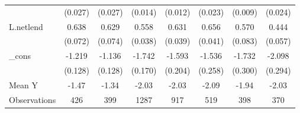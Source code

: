 {\begin{tabular}{l*{7}{c}}
            &     (0.027)         &     (0.027)         &     (0.014)         &     (0.012)         &     (0.023)         &     (0.009)         &     (0.024)         \\
\addlinespace
L.netlend   &       0.638\sym{***}&       0.629\sym{***}&       0.558\sym{***}&       0.631\sym{***}&       0.656\sym{***}&       0.570\sym{***}&       0.444\sym{***}\\
            &     (0.072)         &     (0.074)         &     (0.038)         &     (0.039)         &     (0.041)         &     (0.083)         &     (0.057)         \\
\addlinespace
\_cons      &      -1.219\sym{***}&      -1.136\sym{***}&      -1.742\sym{***}&      -1.593\sym{***}&      -1.536\sym{***}&      -1.732\sym{***}&      -2.098\sym{***}\\
            &     (0.128)         &     (0.128)         &     (0.170)         &     (0.204)         &     (0.258)         &     (0.300)         &     (0.294)         \\
\midrule
Mean Y      &       -1.47         &       -1.34         &       -2.03         &       -2.03         &       -2.09         &       -1.94         &       -2.03         \\
Observations&         426         &         399         &        1287         &         917         &         519         &         398         &         370         \\
\bottomrule
\end{tabular}
}
